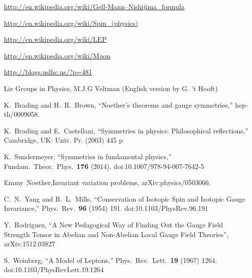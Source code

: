 \begin{thebibliography}{999}
\url{http://en.wikipedia.org/wiki/Gell-Mann–Nishijima_formula}

\url{http://en.wikipedia.org/wiki/Spin_(physics)}

\url{http://en.wikipedia.org/wiki/LEP}

\url{http://en.wikipedia.org/wiki/Muon}

\url{http://blogs.uslhc.us/?p=481}

 Lie Groups in Physics, M.J.G Veltman (English version by G. 't Hooft)

  K.~Brading and H.~R.~Brown,
  ``Noether's theorems and gauge symmetries,''
  hep-th/0009058.


  K.~Brading and E.~Castellani,
  ``Symmetries in physics: Philosophical reflections,''
  Cambridge, UK: Univ. Pr. (2003) 445 p

  K.~Sundermeyer,
  ``Symmetries in fundamental physics,''
  Fundam.\ Theor.\ Phys.\  {\bf 176} (2014).
  doi:10.1007/978-94-007-7642-5

 Emmy~Noether,Invariant variation problems, arXiv:physics/0503066.

  C.~N.~Yang and R.~L.~Mills,
  ``Conservation of Isotopic Spin and Isotopic Gauge Invariance,''
  Phys.\ Rev.\  {\bf 96} (1954) 191.
  doi:10.1103/PhysRev.96.191

Y.~Rodriguez, ``A New Pedagogical Way of Finding Out the Gauge Field Strength Tensor in Abelian and Non-Abelian Local Gauge Field Theories'', arXiv:1512.03827



  S.~Weinberg,
  ``A Model of Leptons,''
  Phys.\ Rev.\ Lett.\  {\bf 19} (1967) 1264.
  doi:10.1103/PhysRevLett.19.1264
\end{thebibliography}
